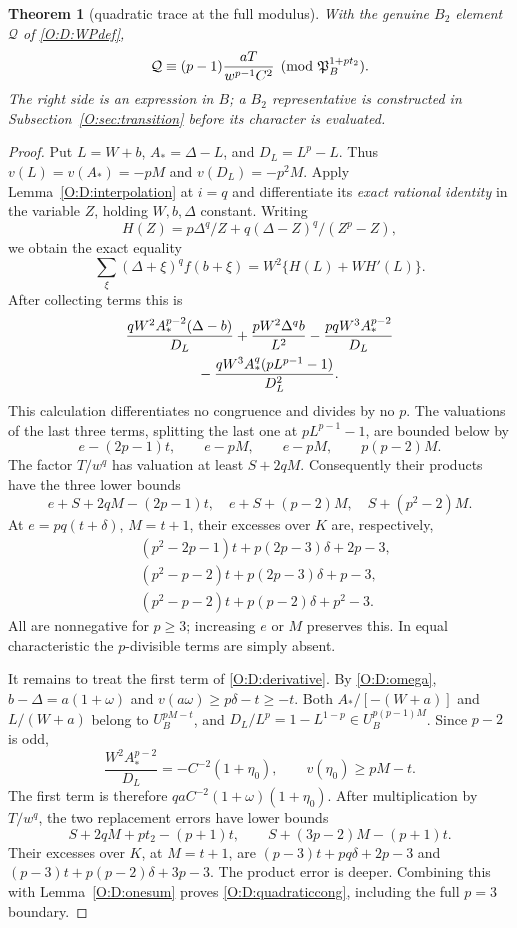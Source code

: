 \documentclass[11pt]{amsart}
\newtheorem{theorem}{Theorem}[section]
\theoremstyle{definition}
\theoremstyle{remark}
\begin{document}
\begin{theorem}[quadratic trace at the full modulus]\label{O:D:quadratic}
With the genuine $B_2$ element $\mathcal Q$ of \eqref{O:D:WPdef},
\begin{equation}\label{O:D:quadraticcong}
 \mathcal Q\equiv(p-1)\frac{aT}{w^{p-1}C^2}
                      \pmod{\mathfrak P_B^{1+pt_2}}.
\end{equation}
The right side is an expression in $B$; a $B_2$ representative is
constructed in Subsection~\ref{O:sec:transition} before its character is evaluated.
\end{theorem}
\begin{proof}
Put $L=W+b$, $A_* =\Delta-L$, and $D_L=L^p-L$.
Thus $v(L)=v(A_*)=-pM$ and $v(D_L)=-p^2M$.
Apply Lemma~\ref{O:D:interpolation} at $i=q$ and differentiate its
\emph{exact rational identity} in the variable $Z$, holding $W,b,\Delta$
constant. Writing
\[
 H(Z)=p\Delta^q/Z+q(\Delta-Z)^q/(Z^p-Z),
\]
we obtain the exact equality
\[
 \sum_\xi(\Delta+\xi)^q f(b+\xi)=W^2\{H(L)+WH'(L)\}.
\]
After collecting terms this is
\begin{align}\label{O:D:derivative}
 &\frac{qW^2A_*^{p-2}(\Delta-b)}{D_L}
 +\frac{pW^2\Delta^q b}{L^2}
 -\frac{pqW^3A_*^{p-2}}{D_L}\notag\\
 &\hspace{18mm}
 -\frac{qW^3A_*^q(pL^{p-1}-1)}{D_L^2}.
\end{align}
This calculation differentiates no congruence and divides by no $p$.
The valuations of the last three terms, splitting the last one at
$pL^{p-1}-1$, are bounded below by
\[
 e-(2p-1)t,\qquad e-pM,\qquad e-pM,\qquad p(p-2)M.
\]
The factor $T/w^q$ has valuation at least $S+2qM$.
Consequently their products have the three lower bounds
\[
 e+S+2qM-(2p-1)t,\quad e+S+(p-2)M,
 \quad S+(p^2-2)M.
\]
At $e=pq(t+\delta)$, $M=t+1$, their excesses over $K$ are,
respectively,
\begin{align*}
 &(p^2-2p-1)t+p(2p-3)\delta+2p-3,\\
 &(p^2-p-2)t+p(2p-3)\delta+p-3,\\
 &(p^2-p-2)t+p(p-2)\delta+p^2-3.
\end{align*}
All are nonnegative for $p\ge3$; increasing $e$ or $M$ preserves this.
In equal characteristic the $p$-divisible terms are simply absent.

It remains to treat the first term of \eqref{O:D:derivative}.
By \eqref{O:D:omega}, $b-\Delta=a(1+\omega)$ and
$v(a\omega)\ge p\delta-t\ge-t$.
Both $A_*/[-(W+a)]$ and $L/(W+a)$ belong to
$U_B^{pM-t}$, and
$D_L/L^p=1-L^{1-p}\in U_B^{p(p-1)M}$.
Since $p-2$ is odd,
\[
 \frac{W^2A_*^{p-2}}{D_L}
 =-C^{-2}(1+\eta_0),\qquad v(\eta_0)\ge pM-t.
\]
The first term is therefore $q a C^{-2}(1+\omega)(1+\eta_0)$.
After multiplication by $T/w^q$, the two replacement errors have
lower bounds
\[
 S+2qM+pt_2-(p+1)t,\qquad
 S+(3p-2)M-(p+1)t.
\]
Their excesses over $K$, at $M=t+1$, are
$(p-3)t+pq\delta+2p-3$ and
$(p-3)t+p(p-2)\delta+3p-3$.
The product error is deeper. Combining this with Lemma~\ref{O:D:onesum}
proves \eqref{O:D:quadraticcong}, including the full $p=3$ boundary.
\end{proof}
\end{document}
